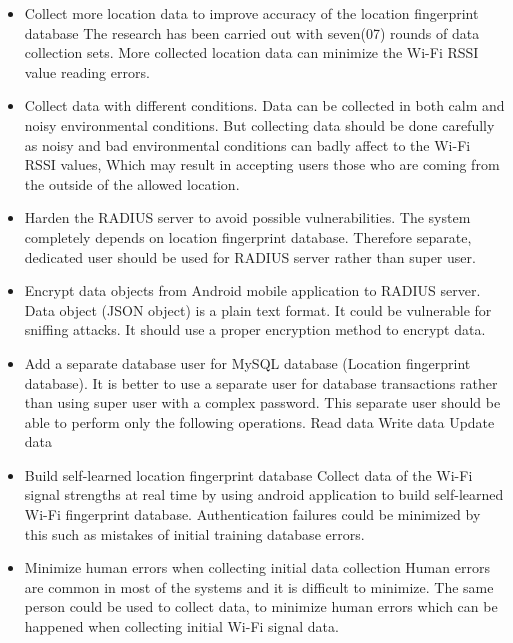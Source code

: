 \begin{itemize}
	\item Collect more location data to improve accuracy of the location fingerprint database
		\subitem The research has been carried out with seven(07) rounds of data collection sets. More collected location data can minimize the Wi-Fi RSSI value reading errors.
		
	\item Collect data with different conditions.
		\subitem Data can be collected in both calm and noisy environmental conditions. But collecting data should be done carefully as noisy and bad environmental conditions can badly affect to the Wi-Fi RSSI values, Which may result in accepting users those who are coming from the outside of the allowed location.
		
	\item Harden the RADIUS server to avoid possible vulnerabilities.
		\subitem The system completely depends on location fingerprint database. Therefore separate, dedicated user should be used for RADIUS server rather than super user.
		
	\item Encrypt data objects from Android mobile application to RADIUS server.
		\subitem Data object (JSON object) is a plain text format. It could be vulnerable for sniffing attacks. It should use a proper encryption method to encrypt data.
		
	\item Add a separate database user for MySQL database (Location fingerprint database).
		\subitem It is better to use a separate user for database transactions rather than using super user with a complex password. This separate user should be able to perform only the following operations.
			\subsubitem Read data
			\subsubitem Write data
			\subsubitem Update data
		 
	\item Build self-learned location fingerprint database
		\subitem Collect data of the Wi-Fi signal strengths at real time by using android application to build self-learned Wi-Fi fingerprint database. Authentication failures could be minimized by this such as mistakes of initial training database errors.
		
	\item Minimize human errors when collecting initial data collection
		\subitem Human errors are common in most of the systems and it is difficult to minimize. The same person could be used to collect data, to minimize human errors which can be happened when collecting initial Wi-Fi signal data.
\end{itemize}
